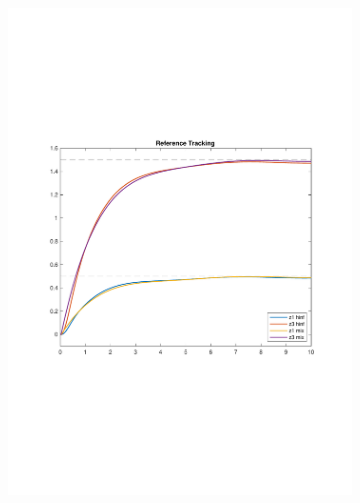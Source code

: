 \documentclass[a4paper, 12pt]{article}
\begin{document}
\begin{figure}[h!]{}
    \begin{subfigure}[t]{0.45\textwidth}
    \includegraphics[width=\textwidth]{Figures/fig09a.pdf}
           \label{fig:fig09a}
    \end{subfigure}
    \begin{subfigure}[t]{0.45\textwidth}

\end{subfigure}
\end{figure}
\end{document}
